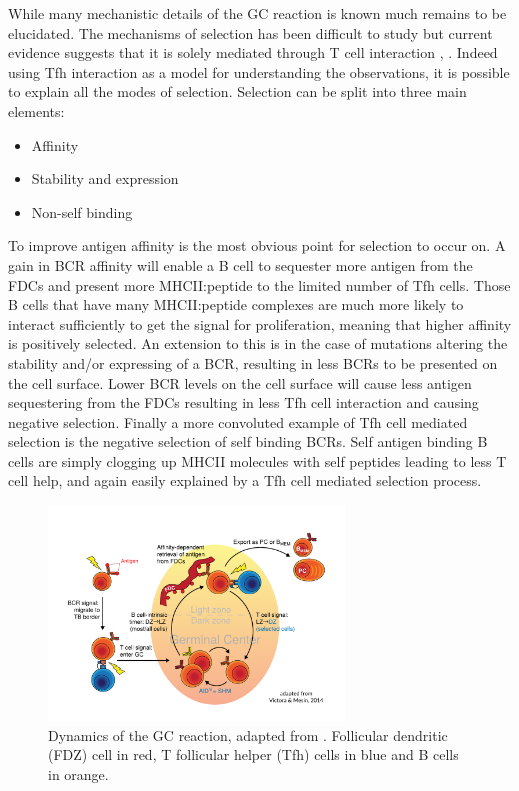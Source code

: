 While many mechanistic details of the GC reaction is known much remains to be elucidated.
The mechanisms of selection has been difficult to study but current evidence suggests that it is solely mediated through T cell interaction \cite{victora2012germinal}, \cite{victora2014clonal}.
Indeed using Tfh interaction as a model for understanding the observations, it is possible to explain all the modes of selection.
Selection can be split into three main elements:
\begin{itemize}
  \item Affinity
  \item Stability and expression
  \item Non-self binding
\end{itemize}

To improve antigen affinity is the most obvious point for selection to occur on.
A gain in BCR affinity will enable a B cell to sequester more antigen from the FDCs and present more MHCII:peptide to the limited number of Tfh cells.
Those B cells that have many MHCII:peptide complexes are much more likely to interact sufficiently to get the signal for proliferation, meaning that higher affinity is positively selected.
An extension to this is in the case of mutations altering the stability and/or expressing of a BCR, resulting in less BCRs to be presented on the cell surface.
Lower BCR levels on the cell surface will cause less antigen sequestering from the FDCs resulting in less Tfh cell interaction and causing negative selection.
Finally a more convoluted example of Tfh cell mediated selection is the negative selection of self binding BCRs.
Self antigen binding B cells are simply clogging up MHCII molecules with self peptides leading to less T cell help, and again easily explained by a Tfh cell mediated selection process.

\begin{figure}
    \centering
    \includegraphics[width=0.7\textwidth]{figures/GC_reaction.pdf}
    \caption{
        \label{fig:GC_reaction}
        Dynamics of the GC reaction, adapted from \cite{victora2014clonal}.
        Follicular dendritic (FDZ) cell in red, T follicular helper (Tfh) cells in blue and B cells in orange.
    }
\end{figure}


